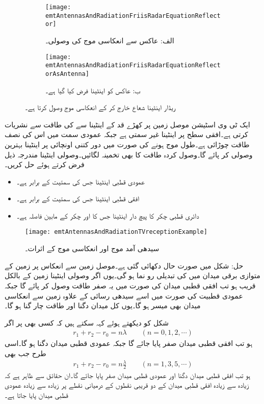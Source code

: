 \begin{figure}
\centering
\begin{subfigure}{0.5\textwidth}
\centering
\texttt{[image: emtAntennasAndRadiationFriisRadarEquationReflector]}
\caption*{الف: عاکس سے انعکاسی موج کی وصولی۔}
\end{subfigure}%
%
\begin{subfigure}{0.5\textwidth}
\centering
\texttt{[image: emtAntennasAndRadiationFriisRadarEquationReflectorAsAntenna]}
\caption*{ب: عاکس کو اینٹینا فرض کیا گیا ہے۔}
\end{subfigure}%
\caption{ریڈار اینٹینا شعاع خارج کر کے انعکاسی موج وصول کرتا ہے۔}
\label{شکل_اینٹینا_ریڈار_ب}
\end{figure}
ایک ٹی وی اسٹیشن موصل زمین پر کھڑے  قد کے اینٹینا سے  کی طاقت سے نشریات کرتی ہے۔افقی سطح پر اینٹینا غیر سمتی ہے جبکہ عمودی سمت میں اس کی نصف طاقت چوڑائی  ہے۔طول موج  ہونے کی صورت میں  دور کتنی اونچائی پر اینٹینا بہترین وصولی کر پائے گا۔وصول کردہ طاقت کا بھی تخمینہ لگائیں۔وصولی اینٹینا مندرجہ ذیل فرض کرتے ہوئے حل کریں۔
\begin{itemize}
\item
عمودی قطبی اینٹینا جس کی سمتیت  کے برابر ہے۔
\item
افقی قطبی اینٹینا جس کی سمتیت  کے برابر ہے۔
\item
دائری قطبی  چکر کا پیچ دار اینٹینا جس کا  اور چکر کے مابین فاصلہ  ہے۔
\end{itemize}

\begin{figure}
\centering
\texttt{[image: emtAntennasAndRadiationTVreceptionExample]}
\caption{سیدھی آمد موج اور انعکاسی موج کے اثرات۔}
\label{شکل_اینٹینا_سیدھی_آمد_انعکاسی_آمد}
\end{figure}


حل: شکل میں صورت حال دکھائی گئی ہے۔موصل زمین سے انعکاس پر زمین کے متوازی برقی میدان میں  کی تبدیلی رو نما ہو گی۔یوں اگر وصولی اینٹینا زمین کے بالکل قریب ہو تب افقی قطبی میدان کی صورت میں یہ صفر طاقت وصول کر پائے گا جبکہ عمودی قطبیت کی صورت میں اسے سیدھی رسائی کے علاوہ زمین سے انعکاسی میدان بھی میسر ہو گا۔یوں کل میدان دگنا اور طاقت چار گنا ہو گا۔

شکل  کو دیکھتے ہوئے کہہ سکتے ہیں کہ کسی بھی   پر اگر
\begin{align}
r_1+r_2-r_0=n\lambda \quad \quad (n=0,1,2,\cdots)
\end{align}
ہو تب افقی قطبی میدان صفر پایا جائے گا جبکہ عمودی قطبی میدان دگنا ہو گا۔اسی طرح جب بھی
\begin{align}
r_1+r_2-r_0=n \frac{\lambda}{2} \quad \quad (n=1,3,5,\cdots)
\end{align}
ہو تب افقی قطبی میدان دگنا اور عمودی قطبی میدان صفر پایا جائے گا۔ان حقائق سے ظاہر ہے کہ زیادہ سے زیادہ افقی قطبی میدان کے دو قریبی نقطوں کے درمیانی نقطے پر زیادہ سے زیادہ عمودی قطبی میدان پایا جاتا ہے۔

